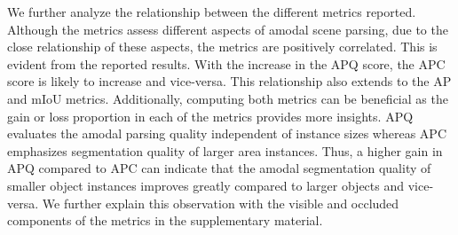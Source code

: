 \documentclass[10pt,twocolumn,letterpaper]{article}
\begin{document}
We further analyze the relationship between the different metrics reported. Although the metrics assess different aspects of amodal scene parsing, due to the close relationship of these aspects, the metrics are positively correlated. This is evident from the reported results. With the increase in the APQ score, the APC score is likely to increase and vice-versa. This relationship also extends to the AP and mIoU metrics. Additionally, computing both metrics can be beneficial as the gain or loss proportion in each of the metrics provides more insights. APQ evaluates the amodal parsing quality independent of instance sizes whereas APC emphasizes segmentation quality of larger area instances. Thus, a higher gain in APQ compared to APC can indicate that the amodal segmentation quality of smaller object instances improves greatly compared to larger objects and vice-versa. We further explain this observation with the visible and occluded components of the metrics in the supplementary material. 
\end{document}
